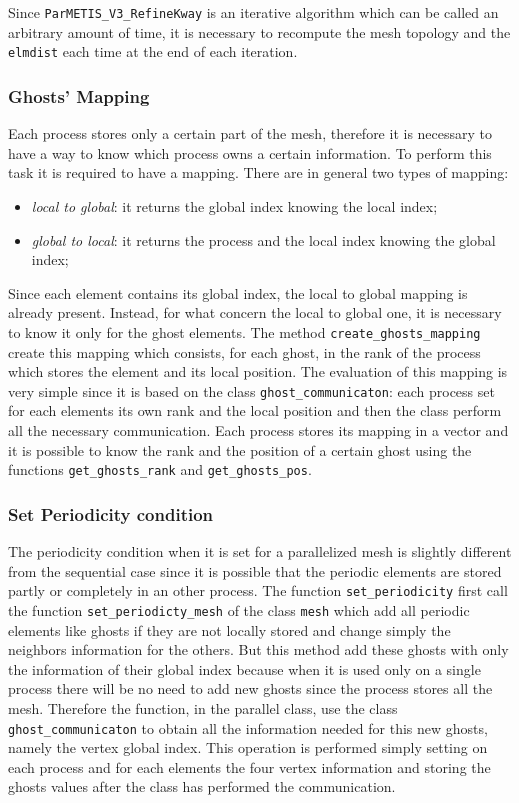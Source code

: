 Since \verb|ParMETIS_V3_RefineKway| is an iterative algorithm which can be called an arbitrary amount of time, it is necessary to recompute the mesh topology and the \verb|elmdist| each time at the end of each iteration.

\subsubsection{Ghosts' Mapping}\label{subsection:ghost_mapping}
Each process stores only a certain part of the mesh, therefore it is necessary to have a way to know which process owns a certain information. To perform this task it is required to have a mapping. There are in general two types of mapping:

\begin{itemize}
\item \textit{local to global}: it returns the global index knowing the local index;
\item \textit{global to local}: it returns the process and the local index knowing the global index;
\end{itemize}

Since each element contains its global index, the local to global mapping is already present. Instead, for what concern the local to global one, it is necessary to know it only for the ghost elements. The method \verb|create_ghosts_mapping| create this mapping which consists, for each ghost, in the rank of the process which stores the element and its local position. The evaluation of this mapping is very simple since it is based on the class \verb|ghost_communicaton|: each process set for each elements its own rank and the local position and then the class perform all the necessary communication. Each process stores its mapping in a vector and it is possible to know the rank and the position of a certain ghost using the functions \verb|get_ghosts_rank| and \verb|get_ghosts_pos|.

\subsubsection{Set Periodicity condition}\label{subsection:set_periodicity}
The periodicity condition when it is set for a parallelized mesh is slightly different from the sequential case since it is possible that the periodic elements are stored partly or completely in an other process. The function \verb|set_periodicity| first call the function \verb|set_periodicty_mesh| of the class \verb|mesh| which add all periodic elements like ghosts if they are not locally stored and change simply the neighbors information for the others. But this method add these ghosts with only the information of their global index because when it is used only on a single process there will be no need to add new ghosts since the process stores all the mesh. Therefore the function, in the parallel class, use the class \verb|ghost_communicaton| to obtain all the information needed for this new ghosts, namely the vertex global index. This operation is performed simply setting on each process and for each elements the four vertex information and storing the ghosts values after the class has performed the
communication.

